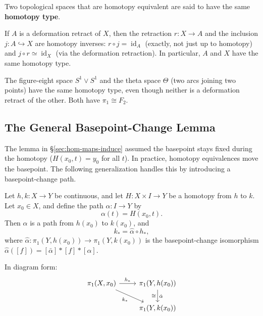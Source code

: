\documentclass[11pt]{report}
\begin{document}
\begin{defbox}
Two topological spaces that are homotopy equivalent are said to have the same \textbf{homotopy type}.
\end{defbox}

\begin{exbox}
If $A$ is a deformation retract of $X$, then the retraction $r: X \to A$ and the inclusion $j: A \hookrightarrow X$ are homotopy inverses: $r \circ j = \operatorname{id}_A$ (exactly, not just up to homotopy) and $j \circ r \simeq \operatorname{id}_X$ (via the deformation retraction). In particular, $A$ and $X$ have the same homotopy type.
\end{exbox}

\begin{exbox}
The figure-eight space $S^1 \vee S^1$ and the theta space $\Theta$ (two arcs joining two points) have the same homotopy type, even though neither is a deformation retract of the other. Both have $\pi_1 \cong F_2$.
\end{exbox}

\subsection{The General Basepoint-Change Lemma}

The lemma in \S\ref{sec:hom-maps-induce} assumed the basepoint stays fixed during the homotopy ($H(x_0, t) = y_0$ for all $t$). In practice, homotopy equivalences move the basepoint. The following generalization handles this by introducing a basepoint-change path.

\begin{lembox}
Let $h, k: X \to Y$ be continuous, and let $H: X \times I \to Y$ be a homotopy from $h$ to $k$. Let $x_0 \in X$, and define the path $\alpha: I \to Y$ by
\[\alpha(t) = H(x_0, t).\]
Then $\alpha$ is a path from $h(x_0)$ to $k(x_0)$, and
\[k_* = \hat{\alpha} \circ h_*,\]
where $\hat{\alpha}: \pi_1(Y, h(x_0)) \to \pi_1(Y, k(x_0))$ is the basepoint-change isomorphism $\hat{\alpha}([f]) = [\bar{\alpha}] * [f] * [\alpha]$.

In diagram form:
\[
\begin{tikzcd}
\pi_1(X, x_0) \arrow[r, "h_*"] \arrow[dr, "k_*"'] & \pi_1(Y, h(x_0)) \arrow[d, "\hat{\alpha}", "\cong"'] \\
& \pi_1(Y, k(x_0))
\end{tikzcd}
\]
\end{lembox}
\end{document}
